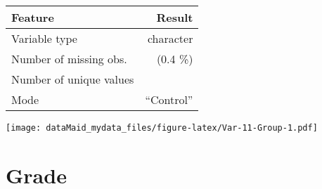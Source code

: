 \documentclass[]{report}
\begin{document}
\begin{minipage}{0.75 \textwidth}

\begin{longtable}[]{@{}lr@{}}
\toprule
\begin{minipage}[b]{0.34\columnwidth}\raggedright
Feature\strut
\end{minipage} & \begin{minipage}[b]{0.16\columnwidth}\raggedleft
Result\strut
\end{minipage}\tabularnewline
\midrule
\endhead
\begin{minipage}[t]{0.34\columnwidth}\raggedright
Variable type\strut
\end{minipage} & \begin{minipage}[t]{0.16\columnwidth}\raggedleft
character\strut
\end{minipage}\tabularnewline
\begin{minipage}[t]{0.34\columnwidth}\raggedright
Number of missing obs.\strut
\end{minipage} & \begin{minipage}[t]{0.16\columnwidth}\raggedleft
1 (0.4 \%)\strut
\end{minipage}\tabularnewline
\begin{minipage}[t]{0.34\columnwidth}\raggedright
Number of unique values\strut
\end{minipage} & \begin{minipage}[t]{0.16\columnwidth}\raggedleft
2\strut
\end{minipage}\tabularnewline
\begin{minipage}[t]{0.34\columnwidth}\raggedright
Mode\strut
\end{minipage} & \begin{minipage}[t]{0.16\columnwidth}\raggedleft
``Control''\strut
\end{minipage}\tabularnewline
\bottomrule
\end{longtable}

\end{minipage}
\begin{minipage}{0.25 \textwidth}

\texttt{[image: dataMaid\_mydata\_files/figure-latex/Var-11-Group-1.pdf]}

\end{minipage}

\noindent\makebox[\linewidth]{\rule{\textwidth}{0.4pt}}

\hypertarget{grade}{%
\section{Grade}\label{grade}}
\end{document}
